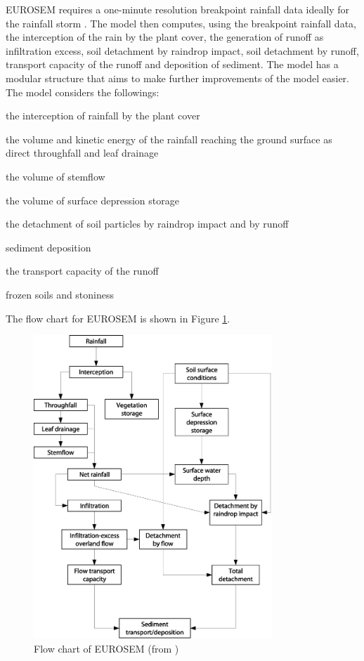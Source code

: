 EUROSEM requires a one-minute resolution breakpoint rainfall data ideally for
the rainfall storm \citep{morgan1998-389}. The model then computes, using the
breakpoint rainfall data, the interception of the rain by the plant cover, the
generation of runoff as infiltration excess, soil detachment by raindrop impact,
soil detachment by runoff, transport capacity of the runoff and deposition of
sediment. The model has a modular structure that aims to make further
improvements of the model easier. The model considers the followings:
\begin{itemize*}
\item the interception of rainfall by the plant cover
\item the volume and kinetic energy of the rainfall reaching the ground surface
as direct throughfall and leaf drainage
\item the volume of stemflow
\item the volume of surface depression storage
\item the detachment of soil particles by raindrop impact and by runoff
\item sediment deposition
\item the transport capacity of the runoff
\item frozen soils and stoniness
\end{itemize*}

The flow chart for EUROSEM is shown in Figure \ref{fig:eurosem_flow_chart}.

\begin{figure}[htbp]
  \centering
    \includegraphics[width=0.80\textwidth]{./img/eurosem_flow_chart}
  \caption[Flow chart of EUROSEM]{Flow chart of EUROSEM (from
\citealp{morgan1998-389})}
  \label{fig:eurosem_flow_chart}
\end{figure}

